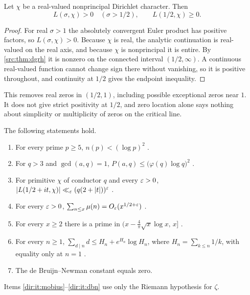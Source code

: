 \begin{proposition}\label{dir:prop:positive}
Let $\chi$ be a real-valued nonprincipal Dirichlet character. Then
\[
 L(\sigma,\chi)>0\quad(\sigma>1/2),\qquad L(1/2,\chi)\ge0 .
\]
\end{proposition}

\begin{proof}
For real $\sigma>1$ the absolutely convergent Euler product has positive factors, so
$L(\sigma,\chi)>0$. Because $\chi$ is real, the analytic continuation is real-valued on
the real axis, and because $\chi$ is nonprincipal it is entire. By \cref{src:thm:dgrh}
it is nonzero on the connected interval $(1/2,\infty)$. A continuous real-valued
function cannot change sign there without vanishing, so it is positive throughout, and
continuity at $1/2$ gives the endpoint inequality.
\end{proof}

This removes real zeros in $(1/2,1)$, including possible exceptional zeros near $1$.
It does not give strict positivity at $1/2$, and zero location alone says nothing about
simplicity or multiplicity of zeros on the critical line.

\begin{theorem}\label{dir:thm:published}
The following statements hold.
\begin{enumerate}[label=\textup{(\alph*)}]
\item\label{dir:it:nonresidue} For every prime $p\ge5$, $n(p)<(\log p)^2$
 \cite[Corollary~1.1]{LamzouriLiSoundararajan2015Conditional}.
\item\label{dir:it:leastprime} For $q>3$ and $\gcd(a,q)=1$,
 $P(a,q)\le\bigl(\varphi(q)\log q\bigr)^2$
 \cite[Corollary~1.2]{LamzouriLiSoundararajan2015Conditional}.
\item\label{dir:it:lindelof} For primitive $\chi$ of conductor $q$ and every $\varepsilon>0$,
 $\lvert L(1/2+it,\chi)\rvert\ll_\varepsilon (q(2+\lvert t\rvert))^{\varepsilon}$ \cite{Chandee2009Explicit}.
\item\label{dir:it:mobius} For every $\varepsilon>0$, $\sum_{n\le x}\mu(n)=O_\varepsilon(x^{1/2+\varepsilon})$
 \cite{Soundararajan2009Partial}.
\item\label{dir:it:short} For every $x\ge2$ there is a prime in
 $(x-\tfrac4\pi\sqrt x\log x,\,x]$ \cite[Theorem~2]{Dudek2015Riemann}.
\item\label{dir:it:lagarias} For every $n\ge1$,
 $\sum_{d\mid n}d\le H_n+e^{H_n}\log H_n$, where $H_n=\sum_{k\le n}1/k$, with equality
 only at $n=1$ \cite[Theorem~1.1]{Lagarias2002Elementary}.
\item\label{dir:it:dbn} The de Bruijn--Newman constant equals zero.
\end{enumerate}
Items \ref{dir:it:mobius}--\ref{dir:it:dbn} use only the Riemann hypothesis for $\zeta$.
\end{theorem}

